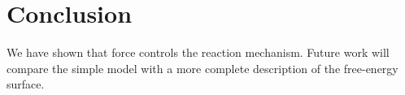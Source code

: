 \documentclass[11pt]{article}
\begin{document}
\section{Conclusion}
We have shown that force controls the reaction mechanism.
Future work will compare the simple model with a more complete
description of the free-energy surface.



\end{document}
